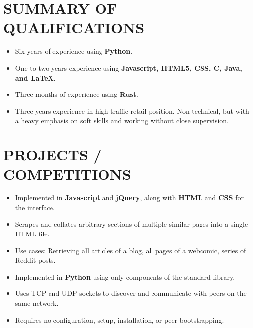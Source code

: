 \documentclass[11pt, margin, line]{res}
\begin{document}
\begin{resume}
 
\vspace{-1.5\topsep}
\section{SUMMARY OF \\ QUALIFICATIONS}   
    \begin{itemize}
        \item Six years of experience using \textbf{Python}.
        \item One to two years experience using \textbf{Javascript, HTML5, CSS, C, Java, and LaTeX}.
        \item Three months of experience using \textbf{Rust}.
        \item Three years experience in high-traffic retail position. Non-technical, but with a heavy emphasis on soft skills and working without close supervision.
    \end{itemize}

\section{PROJECTS /\\ COMPETITIONS}
        \vspace{-\topsep}
        \begin{itemize}
            \item Implemented in \textbf{Javascript} and \textbf{jQuery}, along with \textbf{HTML} and \textbf{CSS} for the interface.
            \item Scrapes and collates arbitrary sections of multiple similar pages into a single HTML file.
            \item Use cases: Retrieving all articles of a blog, all pages of a webcomic, series of Reddit posts.
        \end{itemize}
    
        \vspace{-\topsep}
        \begin{itemize}
            \item Implemented in \textbf{Python} using only components of the standard library.
            \item Uses TCP and UDP sockets to discover and communicate with peers on the same network.
            \item Requires no configuration, setup, installation, or peer bootstrapping.
        \end{itemize}
    

\end{resume}
\end{document}
